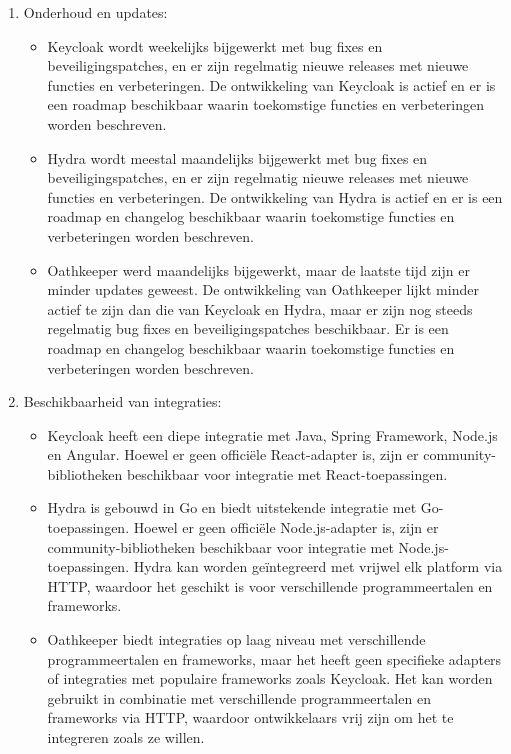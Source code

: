 \begin{enumerate}
  \item Onderhoud en updates:
  \begin{itemize}
    \item Keycloak wordt weekelijks bijgewerkt met bug fixes en beveiligingspatches, en er zijn regelmatig nieuwe releases met nieuwe functies en verbeteringen. De ontwikkeling van Keycloak is actief en er is een roadmap beschikbaar waarin toekomstige functies en verbeteringen worden beschreven.
    \item Hydra wordt meestal maandelijks bijgewerkt met bug fixes en beveiligingspatches, en er zijn regelmatig nieuwe releases met nieuwe functies en verbeteringen. De ontwikkeling van Hydra is actief en er is een roadmap en changelog beschikbaar waarin toekomstige functies en verbeteringen worden beschreven.
    \item Oathkeeper werd maandelijks bijgewerkt, maar de laatste tijd zijn er minder updates geweest. De ontwikkeling van Oathkeeper lijkt minder actief te zijn dan die van Keycloak en Hydra, maar er zijn nog steeds regelmatig bug fixes en beveiligingspatches beschikbaar. Er is een roadmap en changelog beschikbaar waarin toekomstige functies en verbeteringen worden beschreven.
  \end{itemize}
  
  \item Beschikbaarheid van integraties:
  \begin{itemize}
    \item Keycloak heeft een diepe integratie met Java, Spring Framework, Node.js en Angular. Hoewel er geen officiële React-adapter is, zijn er community-bibliotheken beschikbaar voor integratie met React-toepassingen.
    \item Hydra is gebouwd in Go en biedt uitstekende integratie met Go-toepassingen. Hoewel er geen officiële Node.js-adapter is, zijn er community-bibliotheken beschikbaar voor integratie met Node.js-toepassingen. Hydra kan worden geïntegreerd met vrijwel elk platform via HTTP, waardoor het geschikt is voor verschillende programmeertalen en frameworks.
    \item Oathkeeper biedt integraties op laag niveau met verschillende programmeertalen en frameworks, maar het heeft geen specifieke adapters of integraties met populaire frameworks zoals Keycloak. Het kan worden gebruikt in combinatie met verschillende programmeertalen en frameworks via HTTP, waardoor ontwikkelaars vrij zijn om het te integreren zoals ze willen.
  \end{itemize}
  

\end{enumerate}
